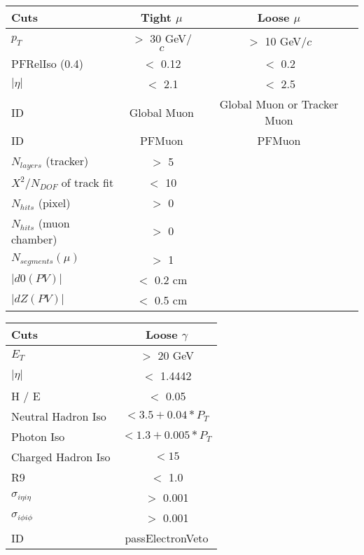 \documentclass[landscape]{article}
\begin{document}
\begin{small}
\begin{center}
    \vspace{10 mm}

    \begin{tabular}{ | l | c | c | }
      \hline \hline
      Cuts & Tight $\mu$ & Loose $\mu$ \\ \hline
      $p_{T}$ & $>$ 30 GeV/$c$ & $>$ 10 GeV/$c$ \\ \hline
      PFRelIso (0.4) & $<$ 0.12 & $<$ 0.2 \\ \hline
      $|\eta|$ & $<$ 2.1 & $<$ 2.5 \\ \hline
      ID & Global Muon & Global Muon or Tracker Muon \\ \hline
      ID & PFMuon & PFMuon \\ \hline
      $N_{layers}$ (tracker) & $>$ 5 & \\ \hline
      $X^{2} / N_{DOF}$ of track fit & $<$ 10 & \\ \hline
      $N_{hits}$ (pixel) & $>$ 0 & \\ \hline
      $N_{hits}$ (muon chamber) & $>$ 0 & \\ \hline
      $N_{segments}(\mu)$ & $>$ 1 & \\ \hline
      $|d0(PV)|$ & $<$ 0.2 cm & \\ \hline
      $|dZ(PV)|$ & $<$ 0.5 cm & \\
      \hline \hline
    \end{tabular}

    \vspace{10 mm}

    \begin{tabular}{ | l | c | }
      \hline \hline
      Cuts & Loose $\gamma$ \\ \hline
      $E_{T}$ & $>$ 20 GeV \\ \hline
      $|\eta|$ & $<$ 1.4442 \\ \hline
      H / E & $<$ 0.05 \\ \hline
      Neutral Hadron Iso & $< 3.5 + 0.04*P_{T}$ \\ \hline
      Photon Iso & $< 1.3 + 0.005*P_{T}$ \\ \hline
      Charged Hadron Iso & $< 15$ \\ \hline
      R9 & $<$ 1.0 \\ \hline
      $\sigma_{i\eta i\eta}$ & $>$ 0.001 \\ \hline
      $\sigma_{i\phi i\phi}$ & $>$ 0.001 \\ \hline
      ID & passElectronVeto \\
      \hline \hline
    \end{tabular}


\end{center}
\end{small}
\end{document}
